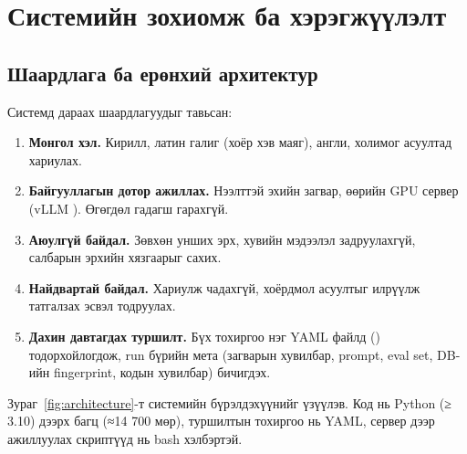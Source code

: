 
\chapter{Системийн зохиомж ба хэрэгжүүлэлт}
\label{Chapter2}
\pagecolor{white}

\section{Шаардлага ба ерөнхий архитектур}
\label{sec:arch}

Системд дараах шаардлагуудыг тавьсан:
\begin{enumerate}
  \item \textbf{Монгол хэл.} Кирилл, латин галиг (хоёр хэв маяг), англи, холимог асуултад хариулах.
  \item \textbf{Байгууллагын дотор ажиллах.} Нээлттэй эхийн загвар, өөрийн GPU сервер (vLLM \cite{kwon_2023_vllm}).
        Өгөгдөл гадагш гарахгүй.
  \item \textbf{Аюулгүй байдал.} Зөвхөн унших эрх, хувийн мэдээлэл задруулахгүй, салбарын эрхийн хязгаарыг сахих.
  \item \textbf{Найдвартай байдал.} Хариулж чадахгүй, хоёрдмол асуултыг илрүүлж татгалзах эсвэл тодруулах.
  \item \textbf{Дахин давтагдах туршилт.} Бүх тохиргоо нэг YAML файлд () тодорхойлогдож, run бүрийн мета (загварын
        хувилбар, prompt, eval set, DB-ийн fingerprint, кодын хувилбар) бичигдэх.
\end{enumerate}

Зураг~\ref{fig:architecture}-т системийн бүрэлдэхүүнийг үзүүлэв. Код нь Python (≥ 3.10) дээрх 
багц (≈14 700 мөр), туршилтын тохиргоо нь YAML, сервер дээр ажиллуулах скриптүүд нь bash хэлбэртэй.


